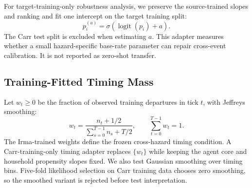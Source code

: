 \documentclass[journal]{IEEEtran}
\begin{document}
For target-training-only robustness analysis, we preserve the source-trained
slopes and ranking and fit one intercept on the target training split:
\begin{equation}
p_i^{(a)}=\sigma\!\left(\operatorname{logit}(p_i)+a\right).
\label{eq:intercept-adapter}
\end{equation}
The Carr test split is excluded when estimating $a$. This adapter measures
whether a small hazard-specific base-rate parameter can repair cross-event
calibration. It is not reported as zero-shot transfer.

\subsection{Training-Fitted Timing Mass}
Let $w_t\geq0$ be the fraction of observed training departures in tick $t$,
with Jeffreys smoothing:
\begin{equation}
w_t=\frac{n_t+1/2}{\sum_{s=0}^{T-1}n_s+T/2},
\qquad \sum_{t=0}^{T-1}w_t=1.
\label{eq:timing-weight}
\end{equation}
The Irma-trained weights define the frozen cross-hazard timing condition. A
Carr-training-only timing adapter replaces $\{w_t\}$ while keeping the agent
core and household propensity slopes fixed. We also test Gaussian smoothing
over timing bins. Five-fold likelihood selection on Carr training data chooses
zero smoothing, so the smoothed variant is rejected before test
interpretation.
\end{document}
